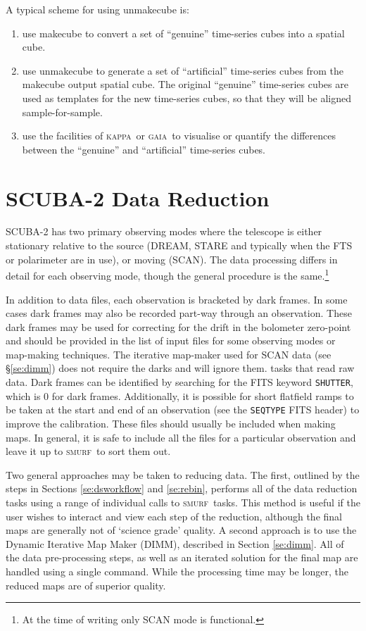 \documentclass[twoside,11pt]{article}
\newcommand{\xlabel}[1]{}
\renewcommand{\_}{\texttt{\symbol{95}}}
\newcommand{\GAIA}{\textsc{gaia}}
\newcommand{\KAPPA}{\textsc{kappa}}
\newcommand{\SMURF}{\textsc{smurf}}
\begin{document}
A typical scheme for using unmakecube is:

\begin{enumerate}
\item use makecube to convert a set of ``genuine'' time-series cubes into
a spatial cube.
\item use unmakecube to generate a set of ``artificial'' time-series cubes
from the makecube output spatial cube. The original ``genuine''
time-series cubes are used as templates for the new time-series cubes, so
that they will be aligned sample-for-sample.
\item use the facilities of \KAPPA\ or \GAIA\ to visualise or quantify the
differences between the ``genuine'' and ``artificial'' time-series cubes.
\end{enumerate}


\section{\xlabel{scuba2}SCUBA-2 Data Reduction\label{se:sc2dr}}

SCUBA-2 has two primary observing modes where the telescope is either
stationary relative to the source (DREAM, STARE and typically when the
FTS or polarimeter are in use), or moving (SCAN). The data processing
differs in detail for each observing mode, though the general
procedure is the same.\footnote{At the time of writing only SCAN mode
  is functional.}

In addition to data files, each observation is bracketed by dark
frames. In some cases dark frames may also be recorded part-way
through an observation. These dark frames may be used for correcting
for the drift in the bolometer zero-point and should be provided in
the list of input files for some observing modes or map-making
techniques. The iterative map-maker used for SCAN data (see
\S\ref{se:dimm}) does not require the darks and will ignore them.
 tasks that read raw data. Dark frames can be identified by searching
 for the FITS keyword \texttt{SHUTTER}, which is 0 for dark
 frames. Additionally, it is possible for short flatfield ramps to be
 taken at the start and end of an observation (see the
 \texttt{SEQ\_TYPE} FITS header) to improve the calibration. These
 files should usually be included when making maps. In general, it is
 safe to include all the files for a particular observation and leave
 it up to \SMURF\ to sort them out.

Two general approaches may be taken to reducing data. The first,
outlined by the steps in Sections \ref{se:dsworkflow} and
\ref{se:rebin}, performs all of the data reduction tasks using a range
of individual calls to \SMURF\ tasks. This method is useful if the user 
wishes to interact and view each step of the reduction, although the final
maps are generally not of `science grade' quality. A second approach is to
use the Dynamic Iterative Map Maker (DIMM), described in Section
\ref{se:dimm}. All of the data pre-processing steps, as well as an
iterated solution for the final map are handled using a single
command. While the processing time may be longer, the reduced maps are
of superior quality.
\end{document}
